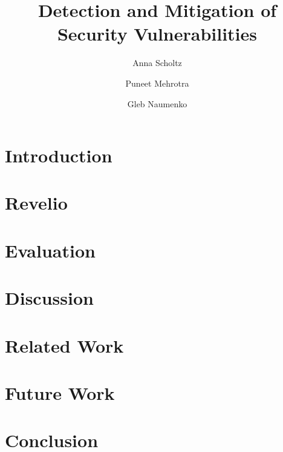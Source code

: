 \documentclass[sigconf]{acmart}
\begin{document}
\title{Detection and Mitigation of Security Vulnerabilities}


\author{Anna Scholtz}


\author{Puneet Mehrotra}


\author{Gleb Naumenko}




\begin{abstract}

\end{abstract}





\maketitle

\section{Introduction}
\label{sec:introduction}


\section{Revelio}
\label{sec:revelio}


\section{Evaluation}
\label{sec:evaluation}



\section{Discussion}
\label{sec:discussion}



\section{Related Work}
\label{sec:related-work}


\section{Future Work}
\label{sec:future-work}



\section{Conclusion}
\label{sec:conclusion}




\end{document}
